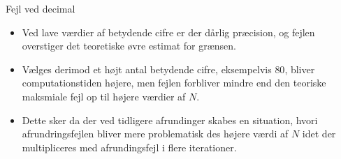 
\begin{frame}{Fejl ved decimal}
\begin{itemize}
\item Ved lave værdier af betydende cifre er der dårlig præcision, og fejlen overstiger det teoretiske øvre estimat for grænsen. 
\item   Vælges derimod et højt antal betydende cifre, eksempelvis $80$, bliver computationstiden højere, men fejlen forbliver mindre end den teoriske maksmiale fejl op til højere værdier af $N$.
\item    Dette sker da der ved tidligere afrundinger skabes en situation, hvori afrundringsfejlen bliver mere problematisk des højere værdi af $N$ idet der multipliceres med afrundingsfejl i flere iterationer.
   \end{itemize}   
\end{frame}